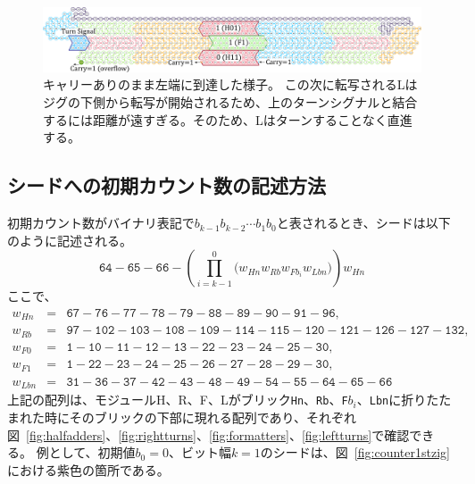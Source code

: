 \documentclass[a4,11pt]{article}
\begin{document}
\begin{figure}[h]
\centering
\includegraphics[width=\linewidth]{fig/svg/CounterEx13_1.pdf}
\caption{
キャリーありのまま左端に到達した様子。
この次に転写されるLはジグの下側から転写が開始されるため、上のターンシグナルと結合するには距離が遠すぎる。そのため、Lはターンすることなく直進する。
}
\label{fig:overflowex1}
\end{figure}
%
%
%
%
%
%
\subsection{シードへの初期カウント数の記述方法}
初期カウント数がバイナリ表記で$b_{k-1}b_{k-2} \cdots b_1b_0$と表されるとき、シードは以下のように記述される。
\begin{equation} \label{eq:zagencoding}
\texttt{64}{-}\texttt{65}{-}\texttt{66}{-}\left( \prod^0_{i = k-1} \bigl(  w_{Hn} w_{Rb} w_{Fb_i} w_{Lbn} \bigr) \right) w_{Hn}
\end{equation}
ここで、
\begin{eqnarray*}
w_{Hn} &=& \texttt{67}{-}\texttt{76}{-}\texttt{77}{-}\texttt{78}{-}\texttt{79}{-}\texttt{88}{-}\texttt{89}{-}\texttt{90}{-}\texttt{91}{-}\texttt{96},\\
w_{Rb} &=& \texttt{97}{-}\texttt{102}{-}\texttt{103}{-}\texttt{108}{-}\texttt{109}{-}\texttt{114}{-}\texttt{115}{-}\texttt{120}{-}\texttt{121}{-}\texttt{126}{-}\texttt{127}{-}\texttt{132},\\
w_{F0} &=& \texttt{1}{-}\texttt{10}{-}\texttt{11}{-}\texttt{12}{-}\texttt{13}{-}\texttt{22}{-}\texttt{23}{-}\texttt{24}{-}\texttt{25}{-}\texttt{30},\\
w_{F1} &=& \texttt{1}{-}\texttt{22}{-}\texttt{23}{-}\texttt{24}{-}\texttt{25}{-}\texttt{26}{-}\texttt{27}{-}\texttt{28}{-}\texttt{29}{-}\texttt{30},\\
 w_{Lbn} &=& \texttt{31}{-}\texttt{36}{-}\texttt{37}{-}\texttt{42}{-}\texttt{43}{-}\texttt{48}{-}\texttt{49}{-}\texttt{54}{-}\texttt{55}{-}\texttt{64}{-}\texttt{65}{-}\texttt{66}
\end{eqnarray*}
上記の配列は、モジュールH、R、F、Lがブリック\texttt{Hn}、\texttt{Rb}、\texttt{F}$b_i$、\texttt{Lbn}に折りたたまれた時にそのブリックの下部に現れる配列であり、それぞれ図~\ref{fig:halfadders}、\ref{fig:rightturns}、\ref{fig:formatters}、\ref{fig:leftturns}で確認できる。
例として、初期値$b_0 = 0$、ビット幅$k = 1$のシードは、図~\ref{fig:counter1stzig}における紫色の箇所である。
\end{document}
